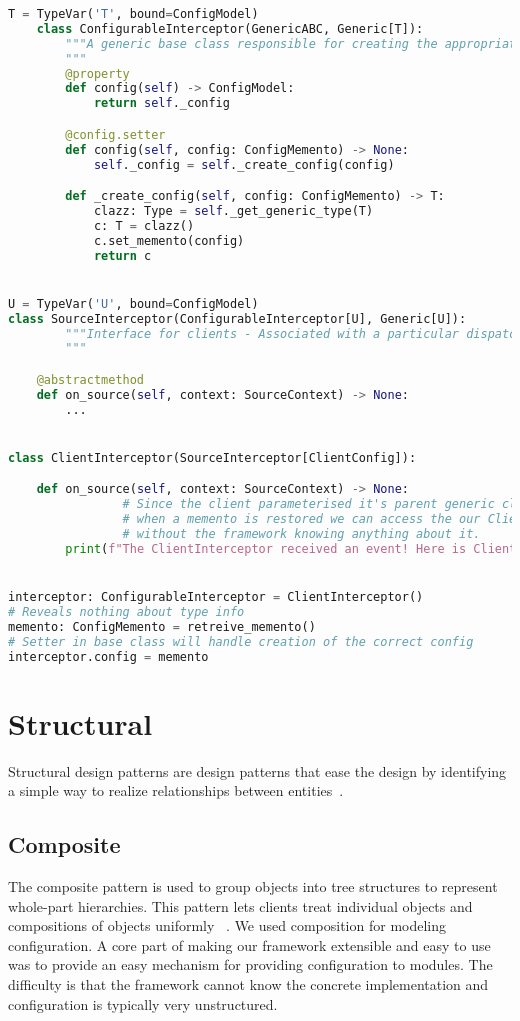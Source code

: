 \begin{lstlisting}[language=Python]
	T = TypeVar('T', bound=ConfigModel)
	class ConfigurableInterceptor(GenericABC, Generic[T]):
	    """A generic base class responsible for creating the appropriate ConfigModel for interceptors.
	    """
	    @property
	    def config(self) -> ConfigModel:
	        return self._config

	    @config.setter
	    def config(self, config: ConfigMemento) -> None:
	        self._config = self._create_config(config)

	    def _create_config(self, config: ConfigMemento) -> T:
	        clazz: Type = self._get_generic_type(T)
	        c: T = clazz()
	        c.set_memento(config)
	        return c


U = TypeVar('U', bound=ConfigModel)
class SourceInterceptor(ConfigurableInterceptor[U], Generic[U]):
		"""Interface for clients - Associated with a particular dispatcher/interception point.
		"""

    @abstractmethod
    def on_source(self, context: SourceContext) -> None:
        ...


class ClientInterceptor(SourceInterceptor[ClientConfig]):

    def on_source(self, context: SourceContext) -> None:
				# Since the client parameterised it's parent generic class,
				# when a memento is restored we can access the our ClientConfig
				# without the framework knowing anything about it.
        print(f"The ClientInterceptor received an event! Here is ClientConfig '{self.config}'")


interceptor: ConfigurableInterceptor = ClientInterceptor()
# Reveals nothing about type info
memento: ConfigMemento = retreive_memento()
# Setter in base class will handle creation of the correct config
interceptor.config = memento

\end{lstlisting}

\section{Structural}
Structural design patterns are design patterns that ease the design by identifying a simple way to
realize relationships between entities~\citep{oodesign}.


\subsection{Composite}
The composite pattern is used to group objects into tree structures to represent whole-part hierarchies.
This pattern lets clients treat individual objects and compositions of objects uniformly ~\citep{sourcemaking}.
We used composition for modeling configuration. A core part of making our framework extensible and easy to use
was to provide an easy mechanism for providing configuration to modules. The difficulty is that the framework
cannot know the concrete implementation and configuration is typically very unstructured.


